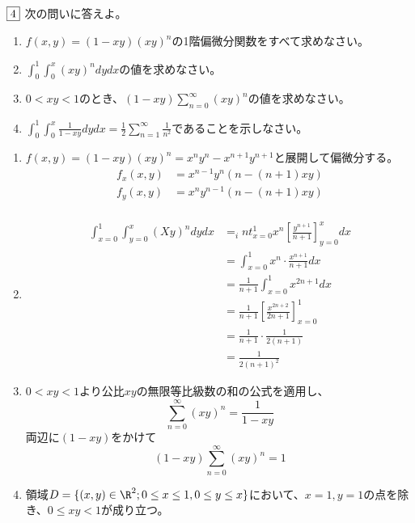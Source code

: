 \begin{tcolorbox} %
	$\fbox{4}$ 次の問いに答えよ。
\begin{enumerate}
	\item $f(x, y)= (1- xy)(xy)^n$の1階偏微分関数をすべて求めなさい。
	\item $\int_0^1\int_0^x (xy)^n dydx$の値を求めなさい。
	\item $0< xy< 1$のとき、$(1- xy)\sum_{n= 0}^\infty (xy)^n$の値を求めなさい。
	\item $\int_0^1\int_0^x \frac{1}{1- xy}dydx= \frac{1}{2}\sum_{n= 1}^\infty \frac{1}{n^2}$であることを示しなさい。
\end{enumerate}
\end{tcolorbox}

\begin{souanswer} %
\begin{enumerate}
    \item $f(x, y)= (1- xy)(xy)^n= x^ny^n- x^{n+ 1}y^{n+ 1}$と展開して偏微分する。
\begin{align*}
    f_x(x, y)&= x^{n- 1}y^n(n- (n+ 1)xy)\\
    f_y(x, y)&= x^ny^{n- 1}(n- (n+ 1)xy)\\
\end{align*}
    \item \label{result:R8_2nd_4(2)}
\begin{align*}
    \int_{x= 0}^1\int_{y= 0}^x (Xy)^ndydx
    &= _int_{x= 0}^1 x^n\left[\frac{y^{n+ 1}}{n+ 1}\right]_{y= 0}^xdx\\
    &= \int_{x= 0}^1 x^n\cdot \frac{x^{n+ 1}}{n+ 1}dx\\
    &= \frac{1}{n+ 1}\int_{x= 0}^1 x^{2n+ 1}dx\\
    &= \frac{1}{n+ 1}\left[\frac{x^{2n+ 2}}{2n+ 1}\right]_{x= 0}^1\\
    &= \frac{1}{n+ 1}\cdot \frac{1}{2(n+ 1)}\\
    &= \frac{1}{2(n+ 1)^2}
\end{align*}
    \item $0< xy< 1$より公比$xy$の無限等比級数の和の公式を適用し、
\begin{equation*}
    \sum_{n= 0}^\infty (xy)^n= \frac{1}{1- xy}
\end{equation*}
    両辺に$(1- xy)$をかけて
\begin{equation*}
    (1- xy)\sum_{n= 0}^\infty (xy)^n= 1
\end{equation*}
    \item 領域$D= \{(x, y)\in \R^2; 0\le x\le 1, 0\le y\le x\}$において、$x= 1, y= 1$の点を除き、$0\le xy< 1$が成り立つ。

\end{enumerate}
\end{souanswer}
